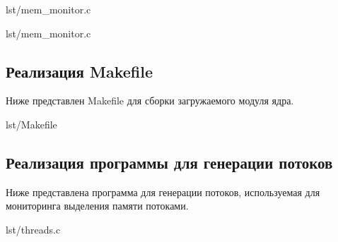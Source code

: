 \begin{lstinputlisting}[
        label={lst:},
        caption={Функция init загружаемого модуля},
        firstline=260,
        lastline=301,
    ]{lst/mem_monitor.c}
\end{lstinputlisting}

\begin{lstinputlisting}[
        label={lst:},
        caption={Функция exit загружаемого модуля},
        firstline=303,
        lastline=322,
    ]{lst/mem_monitor.c}
\end{lstinputlisting}

\subsection{Реализация Makefile}

Ниже представлен Makefile для сборки загружаемого модуля ядра.

\begin{lstinputlisting}[
        label={lst:Makefile},
        caption={Makefile},
        firstline=1,
        lastline=9,
    ]{lst/Makefile}
\end{lstinputlisting}

\newpage

\subsection{Реализация программы для генерации потоков}

Ниже представлена программа для генерации потоков, используемая для мониторинга выделения памяти потоками.

\begin{lstinputlisting}[
        label={lst:threads},
        caption={threads.c},
        firstline=1,
        lastline=25,
    ]{lst/threads.c}
\end{lstinputlisting}

%
